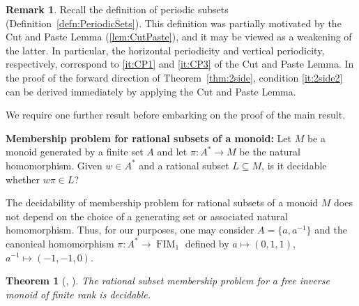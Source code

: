 \documentclass[reqno]{amsart}
\theoremstyle{plain}
\newtheorem{thm}[lem]{Theorem}
\theoremstyle{definition}
\newtheorem{rmk}[lem]{Remark}
\DeclareMathOperator{\FIM}{FIM}
\numberwithin{equation}{section}
\begin{document}
\begin{rmk}
\label{rem:salient}
Recall the definition of periodic subsets (Definition~\ref{defn:PeriodicSets}). 
This definition was partially motivated by the Cut and Paste Lemma (\ref{lem:CutPaste}), and it may be viewed as a weakening of the latter. In particular, the horizontal periodicity and vertical periodicity, respectively, correspond to \ref{it:CP1} and  \ref{it:CP3} of the Cut and Paste Lemma. In the proof of the forward direction of Theorem~\ref{thm:2side},
condition \ref{it:2side2} can be derived immediately by applying the Cut and Paste Lemma.
\end{rmk}

We require one further result before embarking on the proof of the main result. 

\noindent
\textbf{Membership problem for rational subsets of a monoid:} Let $M$ be a monoid generated by a finite set $A$ and let $\pi\colon A^\ast \to M$ be the natural homomorphism. Given $w\in A^\ast$ and a rational subset $L\subseteq M$, is it decidable whether $w\pi \in L$?

The decidability of membership problem for rational subsets of a monoid $M$ does not depend on the choice of a generating set or associated natural homomorphism. Thus, for our purposes, one may consider $A = \{a, a^{-1}\}$ and the canonical homomorphism $\pi\colon A^\ast \to \FIM_1$ defined by $a\mapsto (0, 1, 1)$, $a^{-1}\mapsto (-1, -1, 0)$.

\begin{thm}[{\cite[Theorem 3]{DiekertLohreyMiller}, \cite[Corollary 3.2]{SilvaRationalSubset}}]
\label{thm:Membership}
The rational subset membership problem for a free inverse monoid of finite rank is decidable.
\end{thm}
\end{document}
